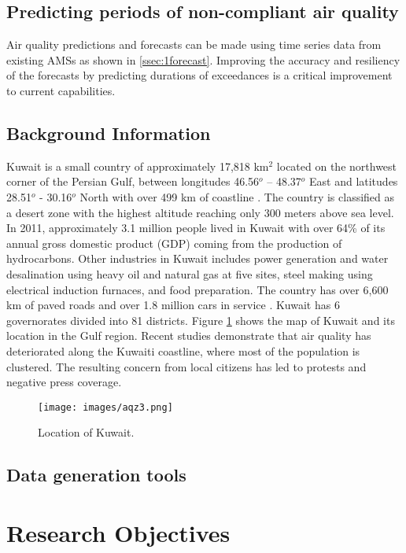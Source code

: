 \subsection{Predicting periods of non-compliant air quality} \label{ss:2Forecast}

Air quality predictions and forecasts can be made using time series data from existing AMSs as shown in \ref{ssec:1forecast}. Improving the accuracy and resiliency of the forecasts by predicting durations of exceedances is a critical improvement to current capabilities. 

\subsection{Background Information}
Kuwait is a small country of approximately 17,818 km$^{2}$  located on the northwest corner of the Persian Gulf, between longitudes 46.56$^{o}$ – 48.37$^{o}$ East and latitudes 28.51$^{o}$ - 30.16$^{o}$ North with over 499 km of coastline \citep{CIA2015}.  The country is classified as a desert zone with the highest altitude reaching only 300 meters above sea level.  In 2011, approximately 3.1 million people lived in Kuwait \citep{CSB2016} with over 64\% of its annual gross domestic product (GDP) coming from the production of hydrocarbons\citep{KAMCO2013}.  Other industries in Kuwait includes power generation and water desalination using heavy oil and natural gas at five sites, steel making using electrical induction furnaces, and food preparation.  The country has over 6,600 km of paved roads and over 1.8 million cars in service \citep{OICA2014}.  Kuwait has 6 governorates divided into 81 districts.  Figure \ref{fig:kuwait} shows the map of Kuwait and its location in the Gulf region.  Recent studies demonstrate that air quality has deteriorated along the Kuwaiti coastline, where most of the population is clustered\citep{Al-Awadhi2014, Al-Yakoob2012}.  The resulting concern from local citizens has led to protests and negative press coverage\citep{Carlisle2010}.
%
\begin{figure}
\texttt{[image: images/aqz3.png]} 
\caption{Location of Kuwait.}
\label{fig:kuwait}
\end{figure}
%

\subsection{Data generation tools}

\section{Research Objectives}

